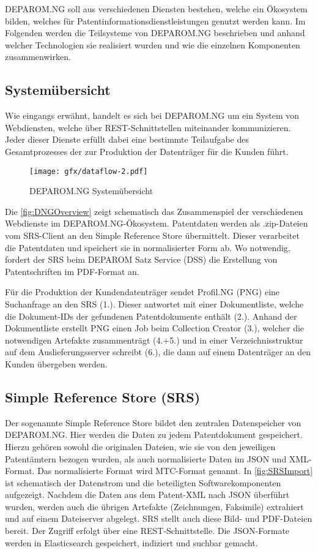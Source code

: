 DEPAROM.NG soll aus verschiedenen Diensten bestehen, welche ein Ökosystem
bilden, welches für Patentinformationsdienstleistungen genutzt werden kann. Im
Folgenden werden die Teilsysteme von DEPAROM.NG  beschrieben und anhand welcher
Technologien sie realisiert wurden und wie die einzelnen Komponenten
zusammenwirken.

\subsection{Systemübersicht}
\label{ch:fachlichesUmfeld:Teilsysteme:Uebersicht}

Wie eingangs erwähnt, handelt es sich bei DEPAROM.NG um ein System von
Webdiensten, welche  über REST-Schnittstellen miteinander kommunizieren. Jeder
dieser Dienste erfüllt dabei eine bestimmte Teilaufgabe des Gesamtprozesses der
zur Produktion der Datenträger für die Kunden führt.

\begin{figure}[h]
  \texttt{[image: gfx/dataflow-2.pdf]}
  \caption{DEPAROM.NG Systemübersicht}
  \label{fig:DNGOverview}
\end{figure}

Die \autoref{fig:DNGOverview} zeigt schematisch das Zusammenspiel der
verschiedenen Webdienste im DEPAROM.NG-Ökosystem. Patentdaten werden als
.zip-Dateien vom SRS-Client an den Simple Reference Store übermittelt. Dieser
verarbeitet die Patentdaten und speichert sie in normalisierter Form ab. Wo
notwendig, fordert der SRS beim DEPAROM Satz Service (DSS) die Erstellung von
Patentschriften im PDF-Format an.

Für die Produktion der Kundendatenträger sendet Profil.NG (PNG) eine Suchanfrage
an den SRS (1.). Dieser antwortet mit einer Dokumentliste, welche die
Dokument-IDs der gefundenen Patentdokumente enthält (2.). Anhand der
Dokumentliste erstellt PNG einen Job beim Collection Creator (3.), welcher die
notwendigen Artefakte zusammenträgt (4.+5.) und in einer Verzeichnisstruktur auf
dem Auslieferungsserver schreibt (6.), die dann auf einem Datenträger an den
Kunden übergeben werden.

\subsection{Simple Reference Store (SRS)}
\label{ch:fachlichesUmfeld:Teilsysteme:SRS}

Der sogenannte Simple Reference Store bildet den zentralen Datenspeicher von
DEPAROM.NG. Hier werden die Daten zu jedem Patentdokument gespeichert. Hierzu
gehören sowohl die originalen Dateien, wie sie von den jeweiligen Patentämtern
bezogen wurden, als auch normalisierte Daten im JSON und XML-Format. Das
normalisierte Format wird MTC-Format genannt. In \autoref{fig:SRSImport} ist
schematisch  der Datenstrom und die beteiligten Softwarekomponenten aufgezeigt.
Nachdem die Daten aus dem Patent-XML nach JSON überführt wurden, werden auch die
übrigen Artefakte (Zeichnungen, Faksimile) extrahiert und auf einem Dateiserver
abgelegt. SRS stellt auch diese Bild- und PDF-Dateien bereit. Der Zugriff
erfolgt über eine REST-Schnittstelle. Die JSON-Formate werden in Elasticsearch
gespeichert, indiziert und suchbar gemacht.

